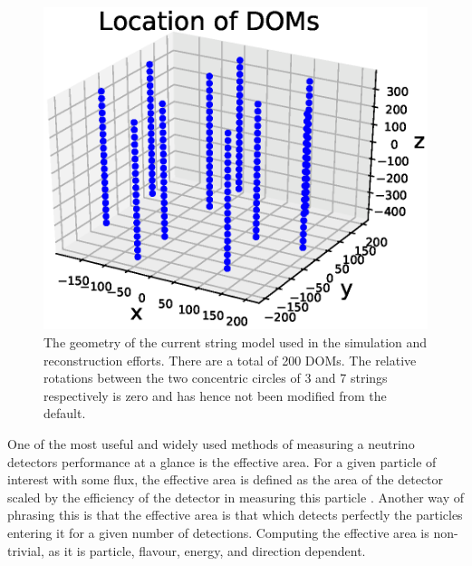 \begin{figure}[H]
  \centering
  \includegraphics[width=12cm]{./Figures/reco_plots/DOM_Locations_3d.eps}
  \caption{The geometry of the current string model used in the simulation and reconstruction efforts. There are a total of 200 DOMs. The relative rotations between the two concentric circles of 3 and 7 strings respectively is zero and has hence not been modified from the default.}
  \label{fig:pone_3d}
\end{figure}

One of the most useful and widely used methods of measuring a neutrino detectors performance at a glance is the effective area. For a given particle of interest with some flux, the effective area is defined as the area of the detector scaled by the efficiency of the detector in measuring this particle \cite{2010icecube}. Another way of phrasing this is that the effective area is that which detects perfectly the particles entering it for a given number of detections. Computing the effective area is non-trivial, as it is particle, flavour, energy, and direction dependent. 
